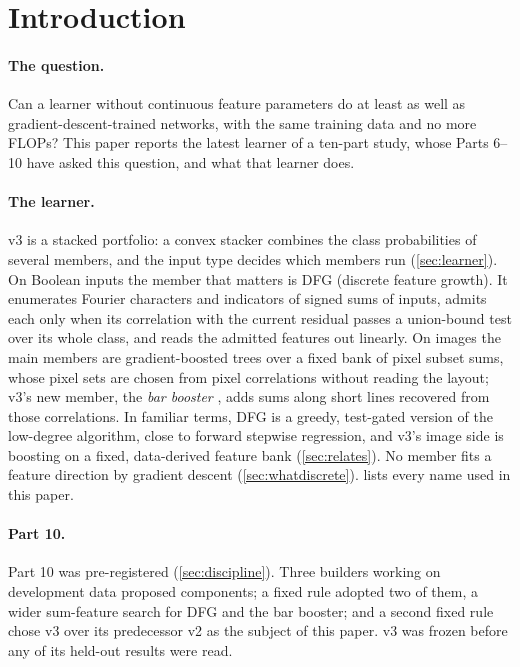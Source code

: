 \section{Introduction}\label{sec:intro}

\paragraph{The question.} Can a learner without continuous feature parameters do at least as well as gradient-descent-trained networks, with the same training data and no more FLOPs? This paper reports the latest learner of a ten-part study, whose Parts 6--10 have asked this question, and what that learner does.

\paragraph{The learner.} v3 is a stacked portfolio: a convex stacker combines the class probabilities of several members, and the input type decides which members run (\cref{sec:learner}). On Boolean inputs the member that matters is DFG (discrete feature growth). It enumerates Fourier characters and indicators of signed sums of inputs, admits each only when its correlation with the current residual passes a union-bound test over its whole class, and reads the admitted features out linearly. On images the main members are gradient-boosted trees over a fixed bank of pixel subset sums, whose pixel sets are chosen from pixel correlations without reading the layout; v3's new member, the \emph{bar booster} , adds sums along short lines recovered from those correlations. In familiar terms, DFG is a greedy, test-gated version of the low-degree algorithm, close to forward stepwise regression, and v3's image side is boosting on a fixed, data-derived feature bank (\cref{sec:relates}). No member fits a feature direction by gradient descent (\cref{sec:whatdiscrete}).  lists every name used in this paper.

\paragraph{Part 10.} Part 10 was pre-registered (\cref{sec:discipline}). Three builders working on development data proposed components; a fixed rule adopted two of them, a wider sum-feature search for DFG and the bar booster; and a second fixed rule chose v3 over its predecessor v2 as the subject of this paper. v3 was frozen before any of its held-out results were read.

